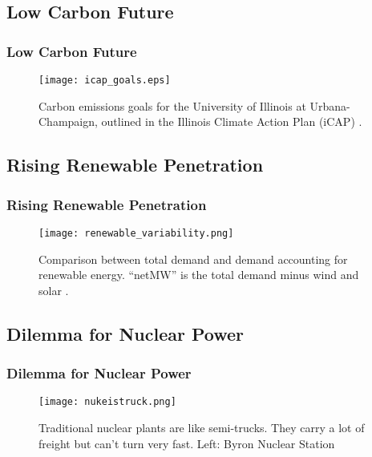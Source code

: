 \subsection{Low Carbon Future}
\begin{frame}
  \frametitle{Low Carbon Future}
  \begin{figure}
    \centering
    \texttt{[image: icap\_goals.eps]}
    \caption{Carbon emissions goals for the University of Illinois at Urbana-Champaign, outlined in the Illinois Climate Action Plan (iCAP) \cite{isee_illinois_2015}.}
    \label{fig:icapgoals}
  \end{figure}
\end{frame}

\subsection{Rising Renewable Penetration}
\begin{frame}
  \frametitle{Rising Renewable Penetration}
  \begin{figure}
    \centering
    \texttt{[image: renewable\_variability.png]}
    \caption{Comparison between total demand and demand accounting for renewable energy. ``netMW'' is the total demand minus wind and solar \cite{alsoenergy_university_2019, uiuc_illini_2019}. }
    \label{fig:variability}
  \end{figure}
\end{frame}

\subsection{Dilemma for Nuclear Power}
\begin{frame}
  \frametitle{Dilemma for Nuclear Power}
  \begin{figure}
    \centering
    \texttt{[image: nukeistruck.png]}
    \caption{Traditional nuclear plants are like semi-trucks. They carry a lot of freight but can't turn very fast. Left: Byron Nuclear Station}
    \label{fig:semitruck}
  \end{figure}
\end{frame}
